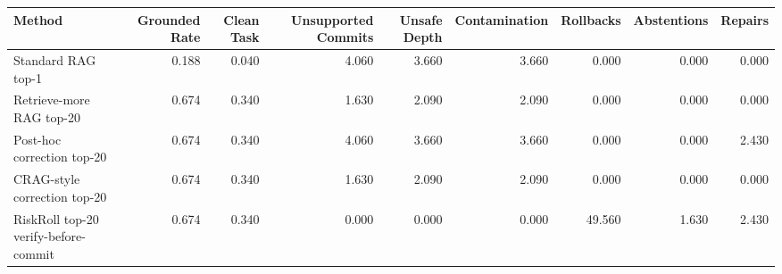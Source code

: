 \begin{tabular}{lrrrrrrrr}
\toprule
Method & Grounded Rate & Clean Task & Unsupported Commits & Unsafe Depth & Contamination & Rollbacks & Abstentions & Repairs \\
\midrule
Standard RAG top-1 & 0.188 & 0.040 & 4.060 & 3.660 & 3.660 & 0.000 & 0.000 & 0.000 \\
Retrieve-more RAG top-20 & 0.674 & 0.340 & 1.630 & 2.090 & 2.090 & 0.000 & 0.000 & 0.000 \\
Post-hoc correction top-20 & 0.674 & 0.340 & 4.060 & 3.660 & 3.660 & 0.000 & 0.000 & 2.430 \\
CRAG-style correction top-20 & 0.674 & 0.340 & 1.630 & 2.090 & 2.090 & 0.000 & 0.000 & 0.000 \\
RiskRoll top-20 verify-before-commit & 0.674 & 0.340 & 0.000 & 0.000 & 0.000 & 49.560 & 1.630 & 2.430 \\
\bottomrule
\end{tabular}
